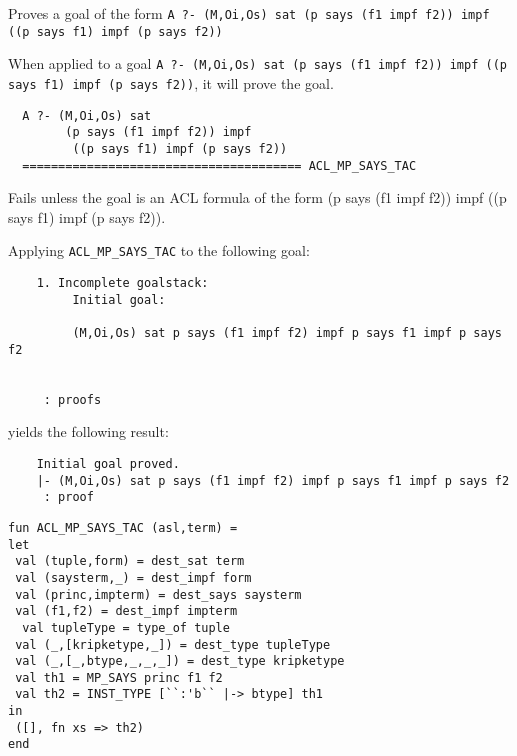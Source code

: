 
\egroup


\SYNOPSIS
Proves a goal of the form \texttt{A ?- (M,Oi,Os) sat (p says (f1 impf f2)) impf ((p says f1) impf (p says f2))}

\DESCRIBE When applied to a goal \texttt{A ?- (M,Oi,Os) sat (p says (f1 impf f2)) impf ((p says f1) impf (p says f2))}, it will prove the goal.
\begin{verbatim}
  A ?- (M,Oi,Os) sat 
        (p says (f1 impf f2)) impf 
         ((p says f1) impf (p says f2))
  ======================================= ACL_MP_SAYS_TAC

\end{verbatim}

\FAILURE 
Fails unless the goal is an ACL formula of the form (p says (f1 impf f2)) impf ((p says f1) impf (p says f2)).

\EXAMPLE
Applying \texttt{ACL\_MP\_SAYS\_TAC} to the following goal:
\begin{holboxed}
\begin{verbatim}
    1. Incomplete goalstack:
         Initial goal:
    
         (M,Oi,Os) sat p says (f1 impf f2) impf p says f1 impf p says f2
    
    
     : proofs
\end{verbatim}
\end{holboxed}
yields the following result:
\begin{holboxed}
\begin{verbatim}
    Initial goal proved.
    |- (M,Oi,Os) sat p says (f1 impf f2) impf p says f1 impf p says f2
     : proof
\end{verbatim}
\end{holboxed}

\IMPLEMENTATION
\begin{holboxed}
\begin{verbatim}
fun ACL_MP_SAYS_TAC (asl,term) =
let
 val (tuple,form) = dest_sat term
 val (saysterm,_) = dest_impf form
 val (princ,impterm) = dest_says saysterm
 val (f1,f2) = dest_impf impterm
  val tupleType = type_of tuple
 val (_,[kripketype,_]) = dest_type tupleType
 val (_,[_,btype,_,_,_]) = dest_type kripketype
 val th1 = MP_SAYS princ f1 f2
 val th2 = INST_TYPE [``:'b`` |-> btype] th1
in
 ([], fn xs => th2)
end
\end{verbatim}
\end{holboxed}

